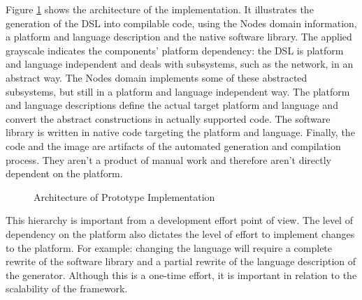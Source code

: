 \documentclass[conference]{IEEEtran}
\begin{document}
Figure \ref{fig:architecture} shows the architecture of the implementation. It
illustrates the generation of the DSL into compilable code, using the Nodes
domain information, a platform and language description and the native software
library. The applied grayscale indicates the components' platform dependency:
the DSL is platform and language independent and deals with subsystems, such as
the network, in an abstract way. The Nodes domain implements some of these
abstracted subsystems, but still in a platform and language independent way.
The platform and language descriptions define the actual target platform and
language and convert the abstract constructions in actually supported code. The
software library is written in native code targeting the platform and language.
Finally, the code and the image are artifacts of the automated generation and
compilation process. They aren't a product of manual work and therefore aren't
directly dependent on the platform.

\begin{figure}[ht]
  \centering
  \caption{Architecture of Prototype Implementation}
  \label{fig:architecture}
\end{figure}

This hierarchy is important from a development effort point of view. The level
of dependency on the platform also dictates the level of effort to implement
changes to the platform. For example: changing the language will require a
complete rewrite of the software library and a partial rewrite of the language
description of the generator. Although this is a one-time effort, it is
important in relation to the scalability of the framework.
\end{document}
